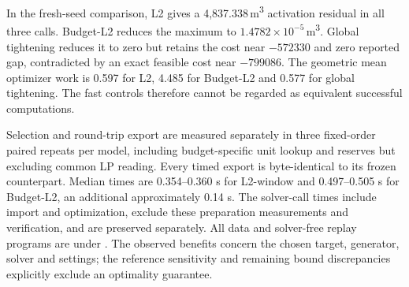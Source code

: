 \documentclass[11pt]{article}
\begin{document}
\begin{table}[tb]
\centering\small
\caption{Controls on instance046, with columns defined in
Table~\ref{tab:activation-bank}. Upper panel: seeds 1, 7 and 42; presolve is
automatic except where stated. Lower panel: fresh seeds 11, 23 and 47 with
presolve disabled throughout. A dash indicates that no native-export witness
was supplied for that reformulation, not that its bounds were certified.
The dyadic L2 control still has one contradicted completion despite exact
row proportionality. NumericFocus 3 is an effective existing alternative.}
\label{tab:activation-controls}

\par\medskip

\end{table}

In the fresh-seed comparison, L2 gives a 4,837.338\,m\textsuperscript{3}
activation residual in all three calls. Budget-L2 reduces the maximum to
$1.4782\times10^{-5}$\,m\textsuperscript{3}. Global tightening reduces it to
zero but retains the cost near $-572330$ and zero reported gap, contradicted
by an exact feasible cost near $-799086$. The geometric mean optimizer work is
0.597 for L2, 4.485 for Budget-L2 and 0.577 for global tightening. The fast
controls therefore cannot be regarded as equivalent successful computations.

\begin{table}[tb]
\centering\small
\caption{Preset numerical volume targets on instance046 with seeds 1, 7 and 42.
Changed rows counts differences from the coefficient-window L2 export.
The demanding row is the corresponding subset of the principal comparison.
All nine points meet their primal budgets, while the looser specifications
permit contradicted completion claims. This is sensitivity of one
configuration, not an estimated failure rate.}
\label{tab:activation-sensitivity}

\end{table}

Selection and round-trip export are measured separately in three fixed-order
paired repeats per model, including budget-specific unit lookup and reserves
but excluding common LP reading. Every timed export is byte-identical to its
frozen counterpart. Median times are 0.354--0.360 s for L2-window and
0.497--0.505 s for Budget-L2, an additional approximately 0.14 s.
The solver-call times include import and optimization, exclude these preparation
measurements and verification, and are preserved separately. All data and
solver-free replay programs are under
. The observed benefits concern the
chosen target, generator, solver and settings; the reference sensitivity and
remaining bound discrepancies explicitly exclude an optimality guarantee.
\end{document}
